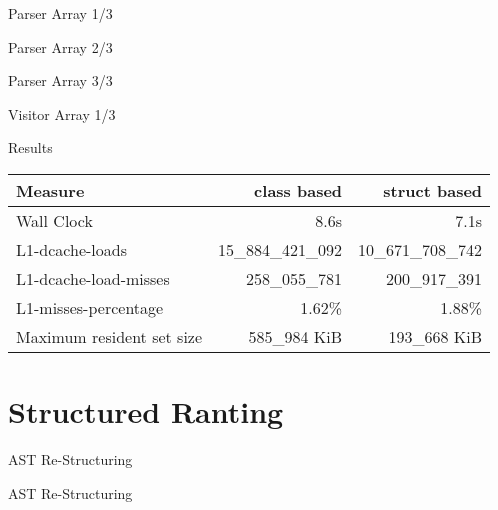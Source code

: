 \documentclass[aspectratio=169,notes]{beamer}
\begin{document}
	\begin{frame}[fragile]{Parser Array 1/3}
		
	\end{frame}

	\begin{frame}[fragile]{Parser Array 2/3}
		
	\end{frame}

	\begin{frame}[fragile]{Parser Array 3/3}
		
	\end{frame}

	\begin{frame}[fragile]{Visitor Array 1/3}
		
	\end{frame}

	\begin{frame}[fragile]{Results}
		\centering
		\begin{tabular}{l r r}
			Measure & class based & struct based \\ \hline
			Wall Clock & 8.6s & 7.1s \\
			L1-dcache-loads & 15\_884\_421\_092 & 10\_671\_708\_742 \\
			L1-dcache-load-misses & 258\_055\_781 & 200\_917\_391 \\
			L1-misses-percentage & 1.62\% & 1.88\% \\
			Maximum resident set size & 585\_984 KiB & 193\_668 KiB
		\end{tabular}
	\end{frame}

	\section{Structured Ranting}

	\begin{frame}[fragile]{AST Re-Structuring}
		
	\end{frame}

	\begin{frame}[fragile]{AST Re-Structuring}
		
	\end{frame}
\end{document}
